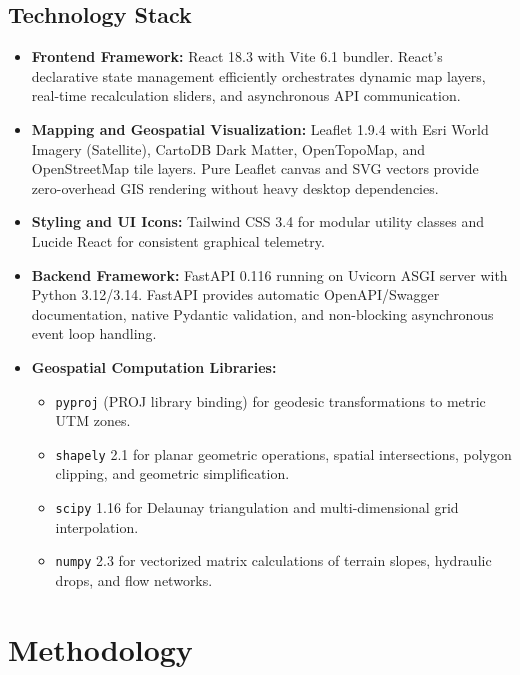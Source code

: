 \documentclass[manuscript,screen,review]{acmart}
\begin{document}
\subsection{Technology Stack}
\begin{itemize}
    \item \textbf{Frontend Framework:} React 18.3 with Vite 6.1 bundler. React's declarative state management efficiently orchestrates dynamic map layers, real-time recalculation sliders, and asynchronous API communication.
    \item \textbf{Mapping and Geospatial Visualization:} Leaflet 1.9.4 with Esri World Imagery (Satellite), CartoDB Dark Matter, OpenTopoMap, and OpenStreetMap tile layers. Pure Leaflet canvas and SVG vectors provide zero-overhead GIS rendering without heavy desktop dependencies.
    \item \textbf{Styling and UI Icons:} Tailwind CSS 3.4 for modular utility classes and Lucide React for consistent graphical telemetry.
    \item \textbf{Backend Framework:} FastAPI 0.116 running on Uvicorn ASGI server with Python 3.12/3.14. FastAPI provides automatic OpenAPI/Swagger documentation, native Pydantic validation, and non-blocking asynchronous event loop handling.
    \item \textbf{Geospatial Computation Libraries:}
    \begin{itemize}
        \item \texttt{pyproj} (PROJ library binding) for geodesic transformations to metric UTM zones.
        \item \texttt{shapely} 2.1 for planar geometric operations, spatial intersections, polygon clipping, and geometric simplification.
        \item \texttt{scipy} 1.16 for Delaunay triangulation and multi-dimensional grid interpolation.
        \item \texttt{numpy} 2.3 for vectorized matrix calculations of terrain slopes, hydraulic drops, and flow networks.
    \end{itemize}
\end{itemize}

\section{Methodology}
\label{sec:methodology}
\end{document}
